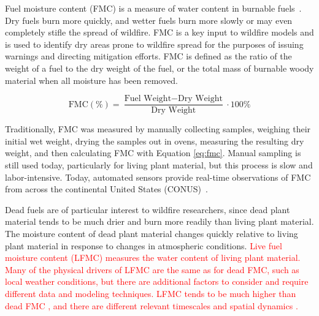 \documentclass[fire,article,submit,pdftex,moreauthors]{Definitions/mdpi}
\begin{document}
Fuel moisture content (FMC) is a measure of water content in burnable fuels~\citep[e.g.,][]{NCEI-2024-DFM}. Dry fuels burn more quickly, and wetter fuels burn more slowly or may even completely stifle the spread of wildfire. FMC is a key input to wildfire models and is used to identify dry areas prone to wildfire spread for the purposes of issuing warnings and directing mitigation efforts. FMC is defined as the ratio of the weight of a fuel to the dry weight of the fuel, or the total mass of burnable woody material when all moisture has been removed. 
\begin{linenomath}
\begin{equation}
\label{eq:fmc}
    \text{FMC} (\%) = \frac{\text{Fuel Weight} - \text{Dry Weight}}{\text{Dry Weight}} \cdot 100\%
\end{equation}
\end{linenomath}
Traditionally, FMC was measured by manually collecting samples, weighing their initial wet weight, drying the samples out in ovens, measuring the resulting dry weight, and then calculating FMC with Equation \ref{eq:fmc}. Manual sampling is still used today, particularly for living plant material, but this process is slow and labor-intensive. Today, automated sensors provide real-time observations of FMC from across the continental United States (CONUS)~\citep{NIFC-2024-RAW}. 

Dead fuels are of particular interest to wildfire researchers, since dead plant material tends to be much drier and burn more readily than living plant material. The moisture content of dead plant material changes quickly relative to living plant material in response to changes in atmospheric conditions. \textcolor{red}{Live fuel moisture content (LFMC) measures the water content of living plant material. Many of the physical drivers of LFMC are the same as for dead FMC, such as local weather conditions, but there are additional factors to consider and require different data and modeling techniques. LFMC tends to be much higher than dead FMC \citep[e.g.,][]{NWCG-2022-LFM}, and there are different relevant timescales and spatial dynamics \citep[e.g.,][]{NWCG-2022-LFM, Lewis-2024-DFM}.}
\end{document}
